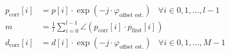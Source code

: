 \begin{align}
  p_{\text{corr}}[i] &= p[i] \cdot \exp(-j \cdot \varphi_{\text{offset est.}})
  \;\;\; \forall i \in {0, 1, \dots, l-1}
  \label{eq:sys_pes_p_correct} \\
  m &= \frac{1}{l}
  \sum_{i=0}^{l-1} \angle(p_{\text{corr}}[i] \cdot p_{\text{first}}[i])
  \label{eq:sys_pes_angle} \\
  d_{\text{corr}}[i] &= d[i] \cdot \exp(-j \cdot \varphi_{\text{offset est.}})
  \;\;\; \forall i \in {0, 1, \dots, M-1}
  \label{eq:sys_pes_d_correct}
\end{align}

